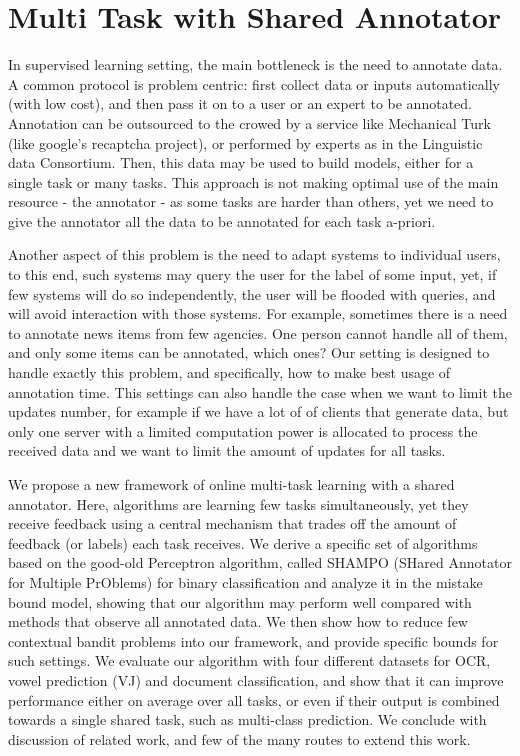 \section{Multi Task with Shared Annotator}
\label{sec:multi_task_intro}

 In supervised learning setting, the main bottleneck is the need to annotate data. A common protocol is 
 problem centric: first collect data or inputs automatically (with low cost), and then 
 pass it on to a user or an expert to be annotated. Annotation can be outsourced to the crowed by a 
 service like Mechanical Turk (like google's recaptcha project), or performed by experts as
  in the Linguistic data Consortium. Then, this data 
 may be used to build models, either for a single task or many tasks. This approach is not making optimal 
 use of the main resource - the annotator - as some tasks are harder than others, yet we need to give the 
 annotator all the data to be annotated for each task a-priori. 
 
 Another aspect of this problem is the need to adapt systems to individual users, to this end, 
 such systems may query the user for the label of some input, yet, if few systems will do so 
 independently, the user will be flooded with queries, and will avoid interaction with those systems. 
 For example, sometimes there is a need to annotate news items from few agencies. One person cannot 
 handle all of them, and only some items can be annotated, which ones? Our setting is designed to handle 
 exactly this problem, and specifically, how to make best usage of annotation time.
 This settings can also handle the case when we want to limit the updates number, 
 for example if we have a lot of of clients that generate data, but only one server with a limited computation 
 power is allocated to process the received data and we want to limit the amount of updates for all tasks.
 
 We propose a new framework of online multi-task learning with a shared annotator. 
 Here, algorithms are learning few tasks simultaneously, yet they receive feedback using a central 
 mechanism that trades off the amount of feedback (or labels) each task receives. We derive a specific 
 set of algorithms based on the good-old Perceptron algorithm, called SHAMPO (SHared Annotator for Multiple 
 PrOblems) for binary classification and analyze it in the mistake bound model, showing that our algorithm 
 may perform well compared with methods that observe all annotated data. We then show how to reduce 
 few contextual bandit problems into our framework, and provide specific bounds for such 
settings. We evaluate our algorithm with four different datasets for OCR, vowel prediction (VJ) and 
document classification, and show that it can improve performance either on average over all tasks, 
or even if their output is combined towards a single shared task, such as multi-class prediction.
 We conclude with discussion of related work, and few of the many routes to extend this work.
